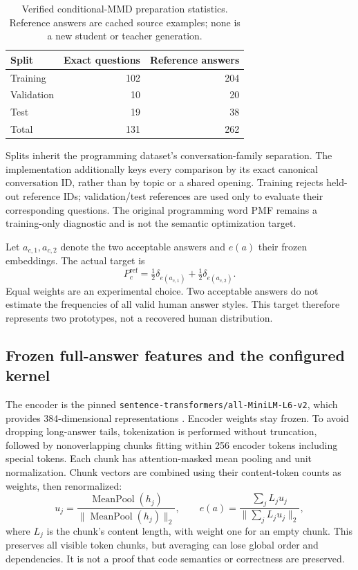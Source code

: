 \begin{table}[htbp]
\centering\small
\caption{Verified conditional-MMD preparation statistics. Reference answers
are cached source examples; none is a new student or teacher generation.}
\label{tab:mmddata}
\begin{tabular}{@{}lrr@{}}
\toprule
Split & Exact questions & Reference answers\\
\midrule
Training & 102 & 204\\
Validation & 10 & 20\\
Test & 19 & 38\\
\midrule
Total & 131 & 262\\
\bottomrule
\end{tabular}
\end{table}

Splits inherit the programming dataset's conversation-family separation.
The implementation additionally keys every comparison by its exact
canonical conversation ID, rather than by topic or a shared opening.
Training rejects held-out reference IDs; validation/test references are
used only to evaluate their corresponding questions. The original
programming word PMF remains a training-only diagnostic and is not the
semantic optimization target.

Let $a_{c,1},a_{c,2}$ denote the two acceptable answers and $e(a)$ their
frozen embeddings. The actual target is
\begin{equation}
 P_c^{\mathrm{ref}}=\tfrac12\delta_{e(a_{c,1})}
                        +\tfrac12\delta_{e(a_{c,2})}.
 \label{eq:mmdtarget}
\end{equation}
Equal weights are an experimental choice. Two acceptable answers do not
estimate the frequencies of all valid human answer styles. This target
therefore represents two prototypes, not a recovered human distribution.

\subsection{Frozen full-answer features and the configured kernel}
The encoder is the pinned
\texttt{sentence-transformers/all-MiniLM-L6-v2}, which provides
384-dimensional representations \cite{minilmcard}. Encoder weights stay
frozen. To avoid dropping long-answer tails, tokenization is performed
without truncation, followed by nonoverlapping chunks fitting within
256 encoder tokens including special tokens. Each chunk has
attention-masked mean pooling and unit normalization. Chunk vectors
are combined using their content-token counts as weights, then
renormalized:
\begin{equation}
 u_j=\frac{\operatorname{MeanPool}(h_j)}
              {\|\operatorname{MeanPool}(h_j)\|_2},\qquad
 e(a)=\frac{\sum_j L_j u_j}{\|\sum_j L_j u_j\|_2},
 \label{eq:chunkembedding}
\end{equation}
where $L_j$ is the chunk's content length, with weight one for an empty
chunk. This preserves all visible token chunks, but averaging can lose
global order and dependencies. It is not a proof that code semantics
or correctness are preserved.

